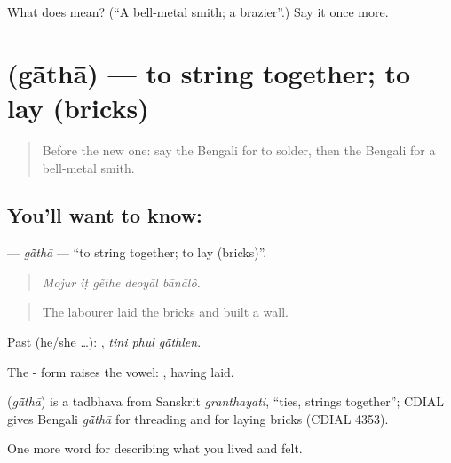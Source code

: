 \begin{tcolorbox}[breakable,colback=teal!4,colframe=teal!35!black,title={Before you move on}]
What does  mean? (\textquotedblleft{}A bell-metal smith; a brazier\textquotedblright{}.) Say it once more.
\end{tcolorbox}
\section[\texorpdfstring{\bn{গাঁথা} (gā̃thā)}{গাঁথা (gā̃thā)}]{ (gā̃thā) — to string together; to lay (bricks)}

\label{lesson:BN-C492-gatha}



\begin{quote}
Before the new one: say the Bengali for to solder, then the Bengali for a bell-metal smith.
\end{quote}

\subsection*{You'll want to know: }
\textbf{} — \emph{gā̃thā} — \textquotedblleft{}to string together; to lay (bricks)\textquotedblright{}.

\begin{quote}
    
\end{quote}

\begin{quote}
\emph{Mojur iṭ gẽthe deoyāl bānālô.}
\end{quote}

\begin{quote}
The labourer laid the bricks and built a wall.
\end{quote}

Past (he/she …):   , \emph{tini phul gā̃thlen}.

The - form raises the vowel: , having laid.

\begin{cousinweb}
\textbf{} (\emph{gā̃thā}) is a tadbhava from Sanskrit \emph{granthayati}, \textquotedblleft{}ties, strings together\textquotedblright{}; CDIAL gives Bengali \emph{gā̃thā} for threading and for laying bricks (CDIAL 4353).
\end{cousinweb}

\begin{grammarlens}[title={What you've built}]
One more word for describing what you lived and felt.
\end{grammarlens}

